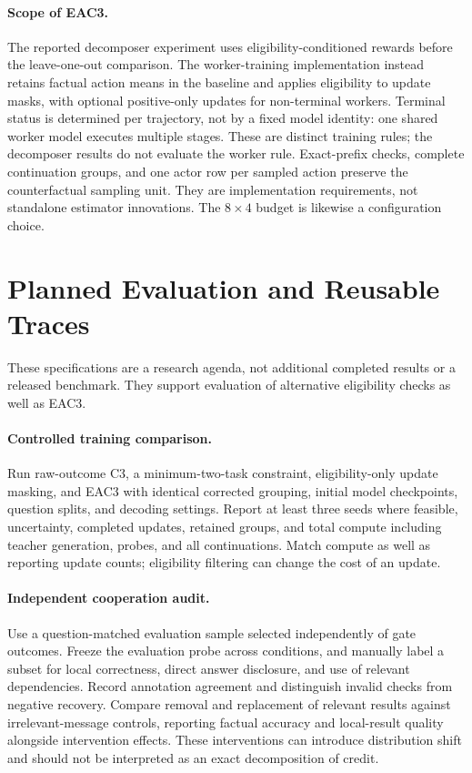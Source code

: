 \documentclass[11pt]{article}
\begin{document}
\paragraph{Scope of EAC3.}
The reported decomposer experiment uses eligibility-conditioned rewards before the leave-one-out comparison. The worker-training implementation instead retains factual action means in the baseline and applies eligibility to update masks, with optional positive-only updates for non-terminal workers. Terminal status is determined per trajectory, not by a fixed model identity: one shared worker model executes multiple stages. These are distinct training rules; the decomposer results do not evaluate the worker rule. Exact-prefix checks, complete continuation groups, and one actor row per sampled action preserve the counterfactual sampling unit. They are implementation requirements, not standalone estimator innovations. The $8\times4$ budget is likewise a configuration choice.

\section{Planned Evaluation and Reusable Traces}
\label{app:future}
These specifications are a research agenda, not additional completed results or a released benchmark. They support evaluation of alternative eligibility checks as well as EAC3.

\paragraph{Controlled training comparison.}
Run raw-outcome C3, a minimum-two-task constraint, eligibility-only update masking, and EAC3 with identical corrected grouping, initial model checkpoints, question splits, and decoding settings. Report at least three seeds where feasible, uncertainty, completed updates, retained groups, and total compute including teacher generation, probes, and all continuations. Match compute as well as reporting update counts; eligibility filtering can change the cost of an update.

\paragraph{Independent cooperation audit.}
Use a question-matched evaluation sample selected independently of gate outcomes. Freeze the evaluation probe across conditions, and manually label a subset for local correctness, direct answer disclosure, and use of relevant dependencies. Record annotation agreement and distinguish invalid checks from negative recovery. Compare removal and replacement of relevant results against irrelevant-message controls, reporting factual accuracy and local-result quality alongside intervention effects. These interventions can introduce distribution shift and should not be interpreted as an exact decomposition of credit.
\end{document}
